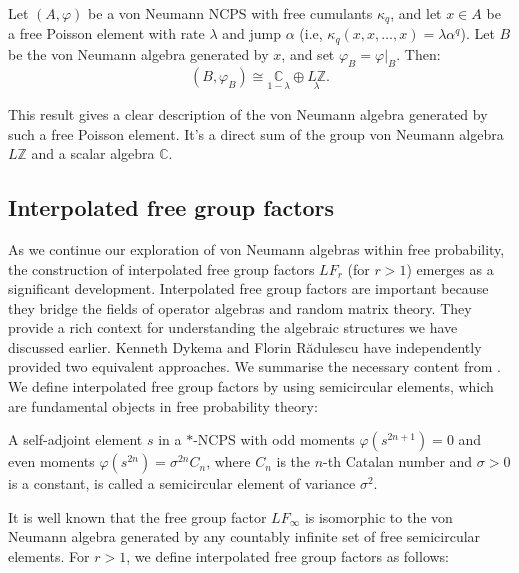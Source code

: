 \begin{proposition}\label{poiprop}
Let $(A, \varphi)$ be a von Neumann NCPS with free cumulants $\kappa_q$, and let $x \in A$ be a free Poisson element with rate $\lambda$ and jump $\alpha$ (i.e, $\kappa_q(x, x, \dots, x) = \lambda\alpha^q$). Let $B$ be the von Neumann algebra generated by $x$, and set $\varphi_B = \varphi|_B$. Then:
\[
(B, \varphi_B) \cong \underset{1 - \lambda}{\mathbb{C}} \oplus \underset{\lambda}{L\mathbb{Z}}.
\]
\end{proposition}

This result gives a clear description of the von Neumann algebra generated by such a free Poisson element. It's a direct sum of the group von Neumann algebra $L\mathbb{Z}$ and a scalar algebra $\mathbb{C}$.

\subsection*{Interpolated free group factors}

As we continue our exploration of von Neumann algebras within free probability, the construction of interpolated free group factors $LF_r$ (for $r > 1$) emerges as a significant development. Interpolated free group factors are important because they bridge the fields of operator algebras and random matrix theory. They provide a rich context for understanding the algebraic structures we have discussed earlier. Kenneth Dykema \cite{LFdyk} and Florin R\u{a}dulescu \cite{Radulesc} have independently provided two equivalent approaches. We summarise the necessary content from \cite{mingo2017}. We define interpolated free group factors by using semicircular elements, which are fundamental objects in free probability theory:

\begin{definition}
    A self-adjoint element $s$ in a $*$-NCPS with odd moments $\varphi(s^{2n+1}) = 0$ and even moments $\varphi(s^{2n}) = \sigma^{2n} C_n$, where $C_n$ is the $n$-th Catalan number and $\sigma > 0$ is a constant, is called a semicircular element of variance $\sigma^2$.
\end{definition}

It is well known that the free group factor $LF_\infty$ is isomorphic to the von Neumann algebra generated by any countably infinite set of free semicircular elements. For $r > 1$, we define interpolated free group factors as follows:

